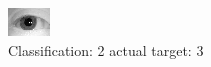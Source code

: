 \begin{figure}[h!]
\begin{center}
\includegraphics[width=0.60\columnwidth]{figures/ID1163_class_2_target_3.png}
\end{center}
\caption{ Classification: 2 actual target: 3}
\label{fig:ID1163_class_2_target_3}
\end{figure}
